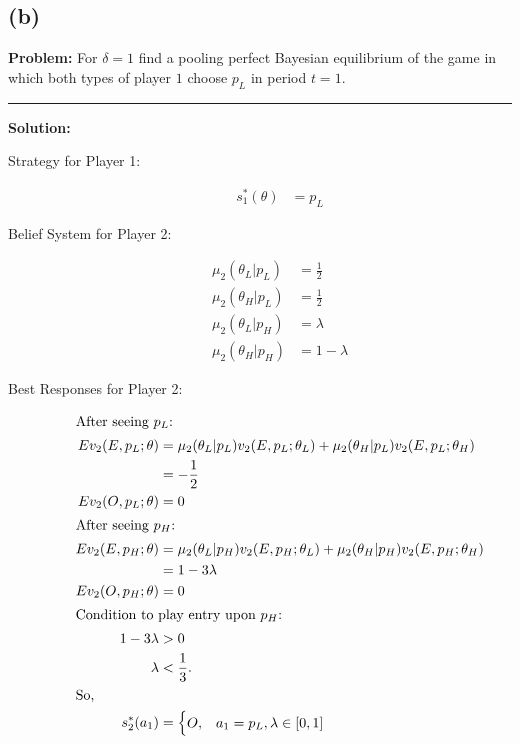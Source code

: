 \documentclass[10pt]{extarticle}
\begin{document}
  \subsection{(b)}%
  \textbf{Problem:} For $\delta = 1$ find a pooling perfect Bayesian equilibrium of the game in which both types of player $1$ choose $p_L$ in period $t=1$.
  \begin{center}
  \rule{\textwidth}{0.4pt}
  \end{center}
  \textbf{Solution:}
    \begin{description}
      \item[Strategy for Player 1:]
        \begin{align*}
          s_1^{\ast}(\theta)&= p_L \tag*{$\forall \theta$}
        \end{align*}
      \item[Belief System for Player 2:]
        \begin{align*}
          \mu_{2}(\theta_L | p_L) &= \frac{1}{2}\\
          \mu_2(\theta_H|p_L) &= \frac{1}{2}\\
          \mu_2(\theta_L|p_H) &= \lambda\\
          \mu_2(\theta_H|p_H) &= 1-\lambda
        \end{align*}
      \item[Best Responses for Player 2:]
        \begin{align*}
          \shortintertext{After seeing $p_L$:}
          Ev_2(E,p_L;\theta) &= \mu_{2}(\theta_L | p_L)v_2(E,p_L;\theta_L) + \mu_{2}(\theta_H | p_L)v_2(E,p_L;\theta_H)\\
                             &=-\frac{1}{2}\\
           Ev_2(O,p_L;\theta) &= 0\\
           \shortintertext{After seeing $p_H$:}
           Ev_2(E,p_H;\theta) &= \mu_{2}(\theta_L | p_H)v_2(E,p_H;\theta_L) + \mu_{2}(\theta_H | p_H)v_2(E,p_H;\theta_H)\\
                              &= 1-3\lambda\\
           Ev_2(O,p_H;\theta) &= 0\\
           \shortintertext{Condition to play entry upon $p_H$:}
           1-3\lambda &> 0\\
           \lambda &< \frac{1}{3}.\\
           \shortintertext{So,}
           s_2^{\ast}(a_1) &= \begin{cases}
             O,&a_1 = p_L,\lambda\in[0,1]\\

\end{cases}
\end{align*}
\end{description}
\end{document}
